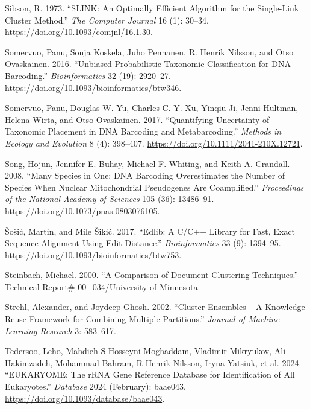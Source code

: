 \documentclass[
]{article}
\newlength{\cslhangindent}
\newenvironment{CSLReferences}[2] %
 {\begin{list}{}{%
  \setlength{\itemindent}{0pt}
  \setlength{\leftmargin}{0pt}
  \setlength{\parsep}{0pt}
  \ifodd #1
   \setlength{\leftmargin}{\cslhangindent}
   \setlength{\itemindent}{-1\cslhangindent}
  \fi
  \setlength{\itemsep}{#2\baselineskip}}}
 {\end{list}}
\begin{document}
\begin{CSLReferences}{1}{0}
Sibson, R. 1973. {``{SLINK}: {An} Optimally Efficient Algorithm for the Single-Link Cluster Method.''} \emph{The Computer Journal} 16 (1): 30--34. \url{https://doi.org/10.1093/comjnl/16.1.30}.

Somervuo, Panu, Sonja Koskela, Juho Pennanen, R. Henrik Nilsson, and Otso Ovaskainen. 2016. {``Unbiased Probabilistic Taxonomic Classification for {DNA} Barcoding.''} \emph{Bioinformatics} 32 (19): 2920--27. \url{https://doi.org/10.1093/bioinformatics/btw346}.

Somervuo, Panu, Douglas W. Yu, Charles C. Y. Xu, Yinqiu Ji, Jenni Hultman, Helena Wirta, and Otso Ovaskainen. 2017. {``Quantifying Uncertainty of Taxonomic Placement in {DNA} Barcoding and Metabarcoding.''} \emph{Methods in Ecology and Evolution} 8 (4): 398--407. \url{https://doi.org/10.1111/2041-210X.12721}.

Song, Hojun, Jennifer E. Buhay, Michael F. Whiting, and Keith A. Crandall. 2008. {``Many Species in One: {DNA} Barcoding Overestimates the Number of Species When Nuclear Mitochondrial Pseudogenes Are Coamplified.''} \emph{Proceedings of the National Academy of Sciences} 105 (36): 13486--91. \url{https://doi.org/10.1073/pnas.0803076105}.

Šošić, Martin, and Mile Šikić. 2017. {``Edlib: A {C}/{C}++ Library for Fast, Exact Sequence Alignment Using Edit Distance.''} \emph{Bioinformatics} 33 (9): 1394--95. \url{https://doi.org/10.1093/bioinformatics/btw753}.

Steinbach, Michael. 2000. {``A Comparison of Document Clustering Techniques.''} Technical Report\# 00\_034/University of Minnesota.

Strehl, Alexander, and Joydeep Ghosh. 2002. {``Cluster {Ensembles} -- {A Knowledge Reuse Framework} for {Combining Multiple Partitions}.''} \emph{Journal of Machine Learning Research} 3: 583--617.

Tedersoo, Leho, Mahdieh S Hosseyni Moghaddam, Vladimir Mikryukov, Ali Hakimzadeh, Mohammad Bahram, R Henrik Nilsson, Iryna Yatsiuk, et al. 2024. {``{EUKARYOME}: The {rRNA} Gene Reference Database for Identification of All Eukaryotes.''} \emph{Database} 2024 (February): baae043. \url{https://doi.org/10.1093/database/baae043}.


\end{CSLReferences}
\end{document}
